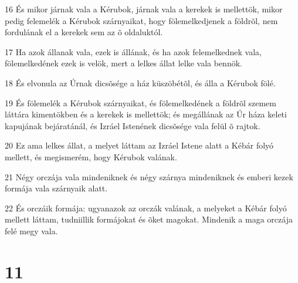 \par 16 És mikor járnak vala a Kérubok, járnak vala a kerekek is mellettök, mikor pedig felemelék a Kérubok szárnyaikat, hogy fölemelkedjenek a földrõl, nem fordulának el a kerekek sem az õ oldaluktól.
\par 17 Ha azok állanak vala, ezek is állának, és ha azok felemelkednek vala, fölemelkedének ezek is velök, mert a lelkes állat lelke vala bennök.
\par 18 És elvonula az Úrnak dicsõsége a ház küszöbétõl, és álla a Kérubok fölé.
\par 19 És fölemelék a Kérubok szárnyaikat, és fölemelkedének a földrõl szemem láttára kimentökben és a kerekek is mellettök; és megállának az Úr háza keleti kapujának bejáratánál, és Izráel Istenének dicsõsége vala felül õ rajtok.
\par 20 Ez ama lelkes állat, a melyet láttam az Izráel Istene alatt a Kébár folyó mellett, és megismerém, hogy Kérubok valának.
\par 21 Négy orczája vala mindeniknek és négy szárnya mindeniknek és emberi kezek formája vala szárnyaik alatt.
\par 22 És orczáik formája: ugyanazok az orczák valának, a melyeket a Kébár folyó mellett láttam, tudniillik formájokat és õket magokat. Mindenik a maga orczája felé megy vala.

\chapter{11}

